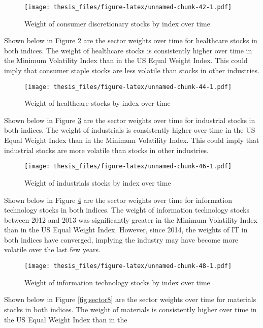 \documentclass[12pt,twoside]{reedthesis}
\theoremstyle{definition}
\theoremstyle{definition}
\theoremstyle{definition}
\theoremstyle{remark}
\begin{document}
\begin{figure}[htbp]
\centering
\texttt{[image: thesis\_files/figure-latex/unnamed-chunk-42-1.pdf]}
\caption{\label{fig:unnamed-chunk-42}Weight of consumer discretionary stocks
by index over time\label{fig:sector4}}
\end{figure}
\newline
Shown below in Figure \ref{fig:sector5} are the sector weights over time
for healthcare stocks in both indices. The weight of healthcare stocks
is consistently higher over time in the Minimum Volatility Index than in
the US Equal Weight Index. This could imply that consumer staple stocks
are less volatile than stocks in other industries.
\begin{figure}[htbp]
\centering
\texttt{[image: thesis\_files/figure-latex/unnamed-chunk-44-1.pdf]}
\caption{\label{fig:unnamed-chunk-44}Weight of healthcare stocks by index
over time\label{fig:sector5}}
\end{figure}
\clearpage
Shown below in Figure \ref{fig:sector6} are the sector weights over time
for industrial stocks in both indices. The weight of industrials is
consistently higher over time in the US Equal Weight Index than in the
Minimum Volatility Index. This could imply that industrial stocks are
more volatile than stocks in other industries.
\begin{figure}[htbp]
\centering
\texttt{[image: thesis\_files/figure-latex/unnamed-chunk-46-1.pdf]}
\caption{\label{fig:unnamed-chunk-46}Weight of industrials stocks by index
over time\label{fig:sector6}}
\end{figure}
\newline
Shown below in Figure \ref{fig:sector7} are the sector weights over time
for information technology stocks in both indices. The weight of
information technology stocks between 2012 and 2013 was significantly
greater in the Minimum Volatility Index than in the US Equal Weight
Index. However, since 2014, the weights of IT in both indices have
converged, implying the industry may have become more volatile over the
last few years.
\begin{figure}[htbp]
\centering
\texttt{[image: thesis\_files/figure-latex/unnamed-chunk-48-1.pdf]}
\caption{\label{fig:unnamed-chunk-48}Weight of information technology stocks
by index over time\label{fig:sector7}}
\end{figure}
\clearpage
Shown below in Figure \ref{fig:sector8} are the sector weights over time
for materials stocks in both indices. The weight of materials is
consistently higher over time in the US Equal Weight Index than in the
\end{document}
